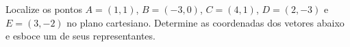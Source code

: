 
\question 
Localize os pontos $A=(1,1)$, $B=(-3,0)$, $C=(4,1)$, $D=(2,-3)$ e $E=(3,-2)$ no plano cartesiano. Determine as coordenadas dos vetores abaixo e esboce um de seus representantes.
			

